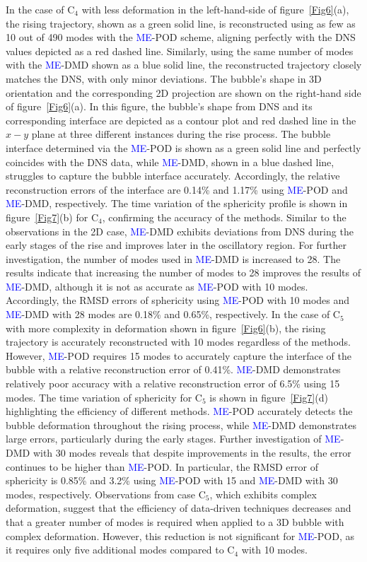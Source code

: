 \documentclass[a4paper,fleqn]{cas-sc}
\newcommand{\hl}[1]{\textcolor{blue}{#1}}
\newcommand{\hl}[1]{#1}
\begin{document}
	
	In the case of C$_4$ with less deformation in the left-hand-side of figure~\ref{Fig6}(a), the rising trajectory, shown as a green solid line, is reconstructed using as few as 10 out of 490 modes with the \hl{ME}-POD scheme, aligning perfectly with the DNS values depicted as a red dashed line. Similarly, using the same number of modes with the \hl{ME}-DMD shown as a blue solid line, the reconstructed trajectory closely matches the DNS, with only minor deviations. The bubble's shape in 3D orientation and the corresponding 2D projection are shown on the right-hand side of figure~\ref{Fig6}(a). In this figure, the bubble's shape from DNS and its corresponding interface are depicted as a contour plot and red dashed line in the $x-y$ plane at three different instances during the rise process. The bubble interface determined via the \hl{ME}-POD is shown as a green solid line and perfectly coincides with the DNS data, while \hl{ME}-DMD, shown in a blue dashed line, struggles to capture the bubble interface accurately. Accordingly, the relative reconstruction errors of the interface are 0.14\% and 1.17\% using \hl{ME}-POD and \hl{ME}-DMD, respectively. The time variation of the sphericity profile is shown in figure~\ref{Fig7}(b) for C$_4$, confirming the accuracy of the methods. Similar to the observations in the 2D case, \hl{ME}-DMD exhibits deviations from DNS during the early stages of the rise and improves later in the oscillatory region. For further investigation, the number of modes used in \hl{ME}-DMD is increased to 28. The results indicate that increasing the number of modes to 28 improves the results of \hl{ME}-DMD, although it is not as accurate as \hl{ME}-POD with 10 modes. Accordingly, the RMSD errors of sphericity using \hl{ME}-POD with 10 modes and \hl{ME}-DMD with 28 modes are 0.18\% and 0.65\%, respectively. In the case of C$_5$ with more complexity in deformation shown in figure~\ref{Fig6}(b), the rising trajectory is accurately reconstructed with 10 modes regardless of the methods. However, \hl{ME}-POD requires 15 modes to accurately capture the interface of the bubble with a relative reconstruction error of 0.41\%. \hl{ME}-DMD demonstrates relatively poor accuracy with a relative reconstruction error of 6.5\% using 15 modes. The time variation of sphericity for C$_5$ is shown in figure~\ref{Fig7}(d) highlighting the efficiency of different methods. \hl{ME}-POD accurately detects the bubble deformation throughout the rising process, while \hl{ME}-DMD demonstrates large errors, particularly during the early stages. Further investigation of \hl{ME}-DMD with 30 modes reveals that despite improvements in the results, the error continues to be higher than \hl{ME}-POD. In particular, the RMSD error of sphericity is 0.85\% and 3.2\% using \hl{ME}-POD with 15 and \hl{ME}-DMD with 30 modes, respectively. Observations from case C$_5$, which exhibits complex deformation, suggest that the efficiency of data-driven techniques decreases and that a greater number of modes is required when applied to a 3D bubble with complex deformation. However, this reduction is not significant for \hl{ME}-POD, as it requires only five additional modes compared to C$_4$ with 10 modes. 
	
\end{document}
